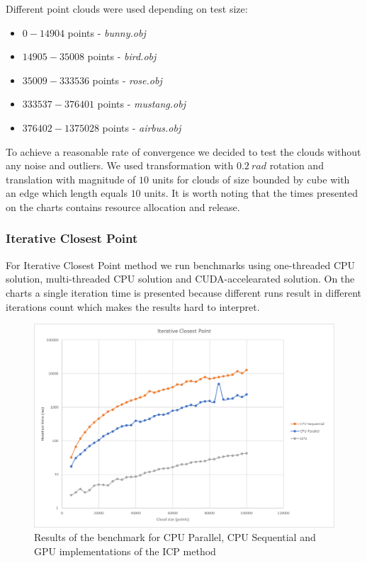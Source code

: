 \documentclass[titlepage]{article}
\begin{document}
Different point clouds were used depending on test size:
\begin{itemize}
\item $0 - 14904$ points - \textit{bunny.obj}
\item $14905 - 35008$ points - \textit{bird.obj}
\item $35009 - 333536$ points - \textit{rose.obj}
\item $333537 - 376401$ points - \textit{mustang.obj}
\item $376402 - 1375028$ points - \textit{airbus.obj}
\end{itemize}

To achieve a reasonable rate of convergence we decided to test the clouds without any noise and outliers. We used transformation with $0.2\: rad$ rotation and translation with magnitude of $10$ units for clouds of size bounded by cube with an edge which length equals $10$ units. It is worth noting that the times presented on the charts contains resource allocation and release.

\subsubsection{Iterative Closest Point}
For Iterative Closest Point method we run benchmarks using one-threaded CPU solution, multi-threaded CPU solution and CUDA-accelearated solution. On the charts a single iteration time is presented because different runs result in different iterations count which makes the results hard to interpret.

\begin{figure}[H]
\includegraphics[width=\textwidth]{ms-icp-1.png}
\caption{Results of the benchmark for CPU Parallel, CPU Sequential and GPU implementations of the ICP method}
\end{figure} 
\end{document}
